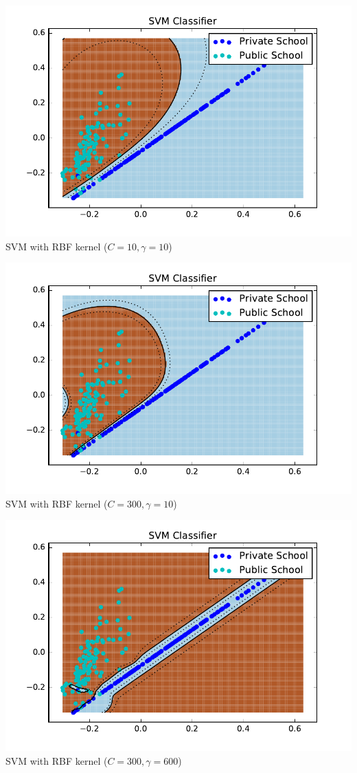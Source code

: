 \documentclass[10pt]{article}
\begin{document}
\includegraphics[width=\textwidth]{figures/svm_3}
SVM with RBF kernel ($ C = 10, \gamma = 10 $)

\includegraphics[width=\textwidth]{figures/svm_4}
SVM with RBF kernel ($ C = 300, \gamma = 10 $)

\includegraphics[width=\textwidth]{figures/svm_5}
SVM with RBF kernel ($ C = 300, \gamma = 600 $)
\end{document}
